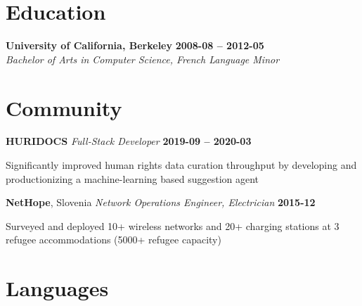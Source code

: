 \documentclass[margin,line]{resume}
\begin{document}
\begin{resume}
  \section{\mysidestyle Education}

  \textbf{University of California, Berkeley}\vspace{0mm}\vspace{0mm}%
  \hfill \textbf{2008-08 -- 2012-05}
  \setlength{\leftmargin}{0.25in}
  \\ \textsl{Bachelor of Arts in Computer Science, French Language Minor}  \vspace{-1.5mm}

  \section{\mysidestyle Community}

  \textbf{HURIDOCS} \vspace{0mm}\vspace{0mm}%
  \textsl{Full-Stack Developer} \hfill \textbf{2019-09 -- 2020-03}\vspace{0mm}\vspace{0mm}%
  \begin{list2}
    \item Significantly improved human rights data curation throughput by developing and productionizing a machine-learning based suggestion agent
  \end{list2}


  \textbf{NetHope}, Slovenia \vspace{0mm}\vspace{0mm}%
  \textsl{Network Operations Engineer, Electrician} \hfill \textbf{2015-12}\vspace{0mm}\vspace{0mm}%
  \begin{list2}
    \item Surveyed and deployed 10+ wireless networks and 20+ charging stations at 3 refugee accommodations (5000+ refugee capacity)
  \end{list2}

  \section{\mysidestyle Languages}


\end{resume}
\end{document}
